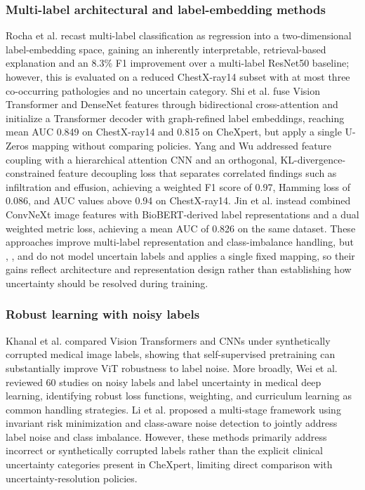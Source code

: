 \documentclass[conference]{IEEEtran}
\begin{document}
\subsubsection*{Multi-label architectural and label-embedding methods}
Rocha et al. \cite{ref9} recast multi-label classification as regression into a two-dimensional label-embedding space, gaining an inherently interpretable, retrieval-based explanation and an 8.3\% F1 improvement over a multi-label ResNet50 baseline; however, this is evaluated on a reduced ChestX-ray14 subset with at most three co-occurring pathologies and no uncertain category. Shi et al. \cite{ref10} fuse Vision Transformer and DenseNet features through bidirectional cross-attention and initialize a Transformer decoder with graph-refined label embeddings, reaching mean AUC 0.849 on ChestX-ray14 and 0.815 on CheXpert, but apply a single U-Zeros mapping without comparing policies. Yang and Wu \cite{ref13} addressed feature coupling with a hierarchical attention CNN and an orthogonal, KL-divergence-constrained feature decoupling loss that separates correlated findings such as infiltration and effusion, achieving a weighted F1 score of 0.97, Hamming loss of 0.086, and AUC values above 0.94 on ChestX-ray14. Jin et al. \cite{ref16} instead combined ConvNeXt image features with BioBERT-derived label representations and a dual weighted metric loss, achieving a mean AUC of 0.826 on the same dataset. These approaches improve multi-label representation and class-imbalance handling, but \cite{ref9}, \cite{ref13}, and \cite{ref16} do not model uncertain labels and \cite{ref10} applies a single fixed mapping, so their gains reflect architecture and representation design rather than establishing how uncertainty should be resolved during training.

\subsubsection*{Robust learning with noisy labels}
Khanal et al. \cite{ref14} compared Vision Transformers and CNNs under synthetically corrupted medical image labels, showing that self-supervised pretraining can substantially improve ViT robustness to label noise. More broadly, Wei et al. \cite{ref15} reviewed 60 studies on noisy labels and label uncertainty in medical deep learning, identifying robust loss functions, weighting, and curriculum learning as common handling strategies. Li et al. \cite{ref17} proposed a multi-stage framework using invariant risk minimization and class-aware noise detection to jointly address label noise and class imbalance. However, these methods primarily address incorrect or synthetically corrupted labels rather than the explicit clinical uncertainty categories present in CheXpert, limiting direct comparison with uncertainty-resolution policies.
\end{document}
